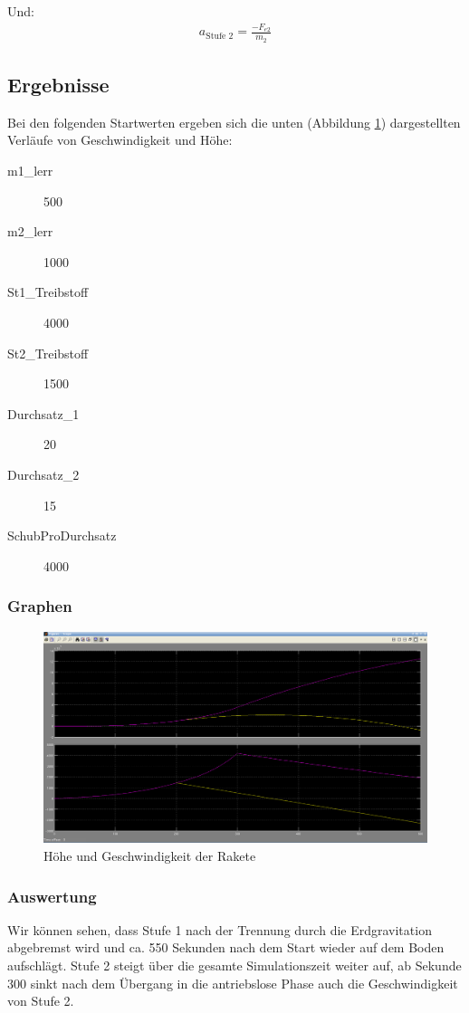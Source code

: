 \documentclass[10pt]{scrartcl}
\begin{document}
	Und:
	\begin{align}
	a_{\text{Stufe 2}} = \frac{- F_{e2}}{m_2}
	\end{align}	

	\subsection{Ergebnisse}
	Bei den folgenden Startwerten ergeben sich die unten (Abbildung \ref{pic:rakete}) dargestellten Verläufe von Geschwindigkeit und Höhe:
	\begin{description}
		\item[m1\_lerr] 500
		\item[m2\_lerr] 1000
		\item[St1\_Treibstoff] 4000
		\item[St2\_Treibstoff] 1500
		\item[Durchsatz\_1] 20
		\item[Durchsatz\_2] 15
		\item[SchubProDurchsatz] 4000
	\end{description}
	
	\subsubsection{Graphen}	
	\begin{figure}[htbp]
		\centering
		\includegraphics[scale=0.25]{ScreenshotRakete.png}
		\caption{Höhe und Geschwindigkeit der Rakete}
		\label{pic:rakete}
	\end{figure}

	\subsubsection{Auswertung}
	Wir können sehen, dass Stufe 1 nach der Trennung durch die Erdgravitation abgebremst wird und ca. 550 Sekunden nach dem Start wieder auf dem Boden aufschlägt. Stufe 2 steigt über die gesamte Simulationszeit weiter auf, ab Sekunde 300 sinkt nach dem Übergang in die antriebslose Phase auch die Geschwindigkeit von Stufe 2.
	
\end{document}
